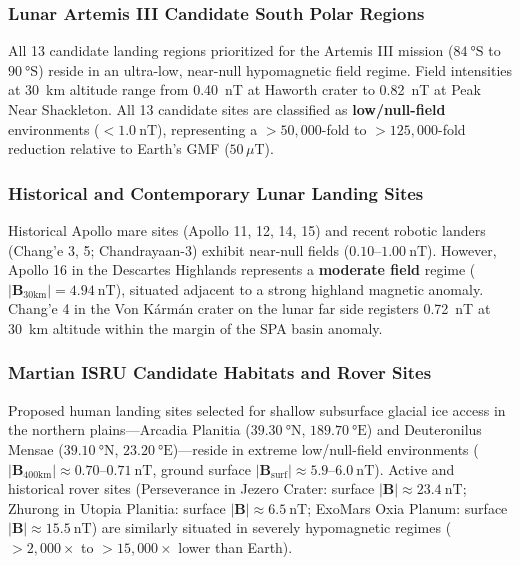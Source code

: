\subsubsection{Lunar Artemis III Candidate South Polar Regions}
All 13 candidate landing regions prioritized for the Artemis III mission ($\SI{84}{\degree}\text{S}$ to $\SI{90}{\degree}\text{S}$) reside in an ultra-low, near-null hypomagnetic field regime. Field intensities at \SI{30}{\kilo\meter} altitude range from \SI{0.40}{\nano\tesla} at Haworth crater to \SI{0.82}{\nano\tesla} at Peak Near Shackleton. All 13 candidate sites are classified as \textbf{low/null-field} environments ($< \SI{1.0}{\nano\tesla}$), representing a $>50,000$-fold to $>125,000$-fold reduction relative to Earth's GMF ($50\,\mu\text{T}$).

\subsubsection{Historical and Contemporary Lunar Landing Sites}
Historical Apollo mare sites (Apollo 11, 12, 14, 15) and recent robotic landers (Chang'e 3, 5; Chandrayaan-3) exhibit near-null fields ($0.10\text{--}\SI{1.00}{\nano\tesla}$). However, Apollo 16 in the Descartes Highlands represents a \textbf{moderate field} regime ($|\mathbf{B}_{\text{30km}}| = \SI{4.94}{\nano\tesla}$), situated adjacent to a strong highland magnetic anomaly. Chang'e 4 in the Von K\'{a}rm\'{a}n crater on the lunar far side registers \SI{0.72}{\nano\tesla} at \SI{30}{\kilo\meter} altitude within the margin of the SPA basin anomaly.

\subsubsection{Martian ISRU Candidate Habitats and Rover Sites}
Proposed human landing sites selected for shallow subsurface glacial ice access in the northern plains—Arcadia Planitia ($\SI{39.30}{\degree}\text{N}$, $\SI{189.70}{\degree}\text{E}$) and Deuteronilus Mensae ($\SI{39.10}{\degree}\text{N}$, $\SI{23.20}{\degree}\text{E}$)—reside in extreme low/null-field environments ($|\mathbf{B}_{\text{400km}}| \approx 0.70\text{--}\SI{0.71}{\nano\tesla}$, ground surface $|\mathbf{B}_{\text{surf}}| \approx 5.9\text{--}\SI{6.0}{\nano\tesla}$). Active and historical rover sites (Perseverance in Jezero Crater: surface $|\mathbf{B}| \approx \SI{23.4}{\nano\tesla}$; Zhurong in Utopia Planitia: surface $|\mathbf{B}| \approx \SI{6.5}{\nano\tesla}$; ExoMars Oxia Planum: surface $|\mathbf{B}| \approx \SI{15.5}{\nano\tesla}$) are similarly situated in severely hypomagnetic regimes ($>2,000\times$ to $>15,000\times$ lower than Earth).

